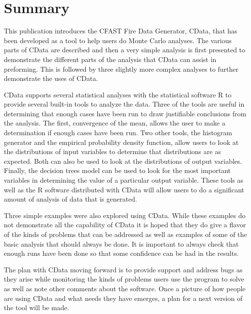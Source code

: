\documentclass[12pt,twoside]{book}
\begin{document}
%
%

\chapter{Summary}

This publication introduces the CFAST Fire Data Generator, CData, that has been developed as a tool to help users do Monte Carlo analyses. The various parts of CData are described and then a very simple analysis is first presented to demonstrate the different parts of the analysis that CData can assist in preforming. This is followed by three slightly more complex analyses to further demonstrate the uses of CData.

CData supports several statistical analyses with the statistical software R to provide several built-in tools to analyze the data. Three of the tools are useful in determining that enough cases have been run to draw justifiable conclusions from the analysis. The first, convergence of the mean, allows the user to make a determination if enough cases have been run. Two other tools, the histogram generator and the empirical probability density function, allow users to look at the distributions of input variables to determine that distributions are as expected. Both can also be used to look at the distributions of output variables. Finally, the decision trees model can be used to look for the most important variables in determining the value of a particular output variable. These tools as well as the R software distributed with CData will allow users to do a significant amount of analysis of data that is generated.

Three simple examples were also explored using CData. While these examples do not demonstrate all the capability of CData it is hoped that they do give a flavor of the kinds of problems that can be addressed as well as examples of some of the basic analysis that should always be done. It is important to always check that enough runs have been done so that some confidence can be had in the results.

The plan with CData moving forward is to provide support and address bugs as they arise while monitoring the kinds of problems users use the program to solve as well as note other comments about the software. Once a picture of how people are using CData and what needs they have emerges, a plan for a next version of the tool will be made.


\end{document}

